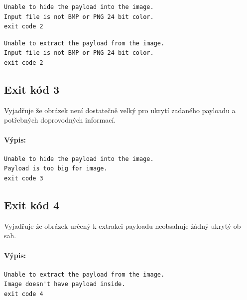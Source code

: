 \documentclass[12pt]{report}
\begin{document}
    \begin{mdframed}
        \begin{verbatim}
Unable to hide the payload into the image.
Input file is not BMP or PNG 24 bit color.
exit code 2
        \end{verbatim}
    \end{mdframed}

    \begin{mdframed}
        \begin{verbatim}
Unable to extract the payload from the image.
Input file is not BMP or PNG 24 bit color.
exit code 2
        \end{verbatim}
    \end{mdframed}

    \subsection{Exit kód 3}
    Vyjadřuje že obrázek není dostatečně velký pro ukrytí zadaného payloadu a
    potřebných doprovodných informací.

    \paragraph{Výpis:}

    \begin{mdframed}
        \begin{verbatim}
Unable to hide the payload into the image.
Payload is too big for image.
exit code 3
        \end{verbatim}
    \end{mdframed}

    \subsection{Exit kód 4}
    Vyjadřuje že obrázek určený k extrakci payloadu neobsahuje žádný ukrytý ob-
    sah.\\

    \paragraph{Výpis:}

    \begin{mdframed}
        \begin{verbatim}
Unable to extract the payload from the image.
Image doesn't have payload inside.
exit code 4
        \end{verbatim}
    \end{mdframed}
\end{document}

